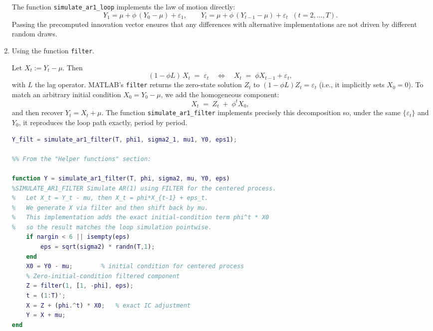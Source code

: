 \documentclass[dvipsnames,11pt]{article}
\begin{document}
\begin{enumerate}[label=\alph*.]
\begin{solution}
                The function \texttt{simulate\_ar1\_loop} implements the law of motion directly:
                \[
                  Y_1 = \mu + \phi\,(Y_0-\mu) + \varepsilon_1,\qquad
                  Y_t = \mu + \phi\,(Y_{t-1}-\mu) + \varepsilon_t \;\; (t=2,\dots,T).
                \]
                Passing the precomputed innovation vector ensures that any differences with alternative implementations are not driven by different random draws.
        
            \end{solution}  

        \item Using the function \texttt{filter}.

            \begin{solution}

                Let $X_t := Y_t-\mu$. Then
                \[
                  (1-\phi L)\,X_t \;=\; \varepsilon_t
                  \quad\Longleftrightarrow\quad
                  X_t \;=\; \phi X_{t-1} + \varepsilon_t,
                \]
                with $L$ the lag operator. MATLAB’s \texttt{filter} returns the zero-state solution $Z_t$ to 
                $ (1-\phi L)Z_t=\varepsilon_t $ (i.e., it implicitly sets $X_0=0$). 
                To match an arbitrary initial condition $X_0=Y_0-\mu$, we add the homogeneous component:
                \[
                  X_t \;=\; Z_t \;+\; \phi^t X_0,
                \]
                and then recover $Y_t=X_t+\mu$. The function \texttt{simulate\_ar1\_filter} implements precisely this decomposition so, under the same $\{\varepsilon_t\}$ and $Y_0$, it reproduces the loop path exactly, period by period.

\begin{lstlisting}[language=Matlab]
Y_filt = simulate_ar1_filter(T, phi1, sigma2_1, mu1, Y0, eps1);

%% From the "Helper functions" section:

function Y = simulate_ar1_filter(T, phi, sigma2, mu, Y0, eps)
%SIMULATE_AR1_FILTER Simulate AR(1) using FILTER for the centered process.
%   Let X_t = Y_t - mu, then X_t = phi*X_{t-1} + eps_t.
%   We generate X via filter and then shift back by mu.
%   This implementation adds the exact initial-condition term phi^t * X0
%   so the result matches the loop simulation pointwise.
    if nargin < 6 || isempty(eps)
        eps = sqrt(sigma2) * randn(T,1);
    end
    X0 = Y0 - mu;        % initial condition for centered process
    % Zero-initial-condition filtered component
    Z = filter(1, [1, -phi], eps);
    t = (1:T)';
    X = Z + (phi.^t) * X0;   % exact IC adjustment
    Y = X + mu;
end
\end{lstlisting}
                

\end{solution}
\end{enumerate}
\end{document}
